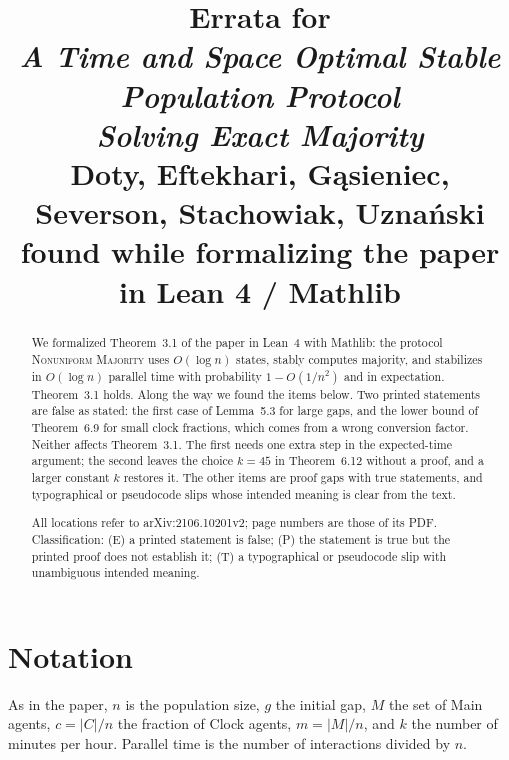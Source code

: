 \documentclass[11pt]{article}
\title{Errata for\\
  \emph{A Time and Space Optimal Stable Population Protocol\\
  Solving Exact Majority}\\[2mm]
  {\large Doty, Eftekhari, G\k{a}sieniec, Severson, Stachowiak, Uzna\'nski}\\[4mm]
  {\large found while formalizing the paper in Lean 4 / Mathlib}}
\author{}
\date{}
\theoremstyle{erratumstyle}
\begin{document}
\maketitle

\begin{abstract}
We formalized Theorem~3.1 of the paper in Lean~4 with Mathlib: the protocol
\textsc{Nonuniform Majority} uses $O(\log n)$ states, stably computes
majority, and stabilizes in $O(\log n)$ parallel time with probability
$1-O(1/n^2)$ and in expectation. Theorem~3.1 holds. Along the way we found
the items below. Two printed statements are false as stated: the first case
of Lemma~5.3 for large gaps, and the lower bound of Theorem~6.9 for small
clock fractions, which comes from a wrong conversion factor. Neither affects
Theorem~3.1. The first needs one extra step in the expected-time argument;
the second leaves the choice $k=45$ in Theorem~6.12 without a proof, and a
larger constant $k$ restores it. The other items are proof gaps with true
statements, and typographical or pseudocode slips whose intended meaning is
clear from the text.

All locations refer to arXiv:2106.10201v2; page numbers are those of its PDF.
Classification: (E) a printed statement is false; (P) the statement is true
but the printed proof does not establish it; (T) a typographical or pseudocode
slip with unambiguous intended meaning.
\end{abstract}

\section*{Notation}

As in the paper, $n$ is the population size, $g$ the initial gap, $M$ the set
of Main agents, $c=|C|/n$ the fraction of Clock agents, $m=|M|/n$, and $k$ the
number of minutes per hour. Parallel time is the number of interactions
divided by $n$.
\end{document}
